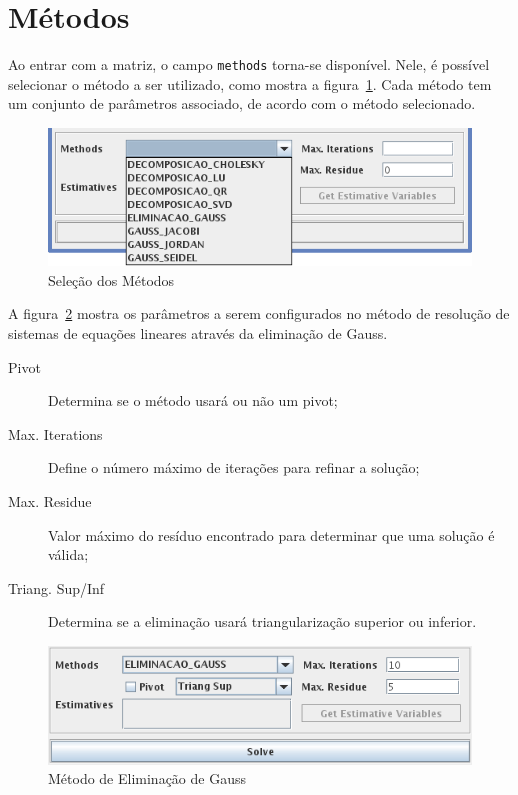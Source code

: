 \documentclass[a4paper,10pt]{report}
\begin{document}
\section{Métodos}

Ao entrar com a matriz, o campo \verb|methods| torna-se disponível. Nele, é possível selecionar o método a ser utilizado, como mostra a figura~\ref{fig:metodos}. Cada método tem um conjunto de parâmetros associado, de acordo com o método selecionado.

\begin{figure}[ht]
 \centering
 \includegraphics[scale=0.8, bb=0 0 363 118]{screen-5-methods.png}
 \caption{Seleção dos Métodos}
 \label{fig:metodos}
\end{figure}

A figura~\ref{fig:elim} mostra os parâmetros a serem configurados no método de resolução de sistemas de equações lineares através da eliminação de Gauss.
\begin{description}
 \item[Pivot] Determina se o método usará ou não um pivot;
 \item[Max. Iterations] Define o número máximo de iterações para refinar a solução;
 \item[Max. Residue] Valor máximo do resíduo encontrado para determinar que uma solução é válida;
 \item[Triang. Sup/Inf] Determina se a eliminação usará triangularização superior ou inferior.
 \end{description}

\begin{figure}[ht]
 \centering
 \includegraphics[scale=0.8, bb=0 0 353 99]{screen-6-elim.png}
 \caption{Método de Eliminação de Gauss}
 \label{fig:elim}
\end{figure}
\end{document}
